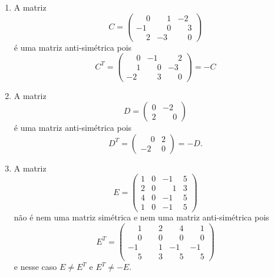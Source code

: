 \begin{exemplos}
\begin{enumerate}
        \item A matriz
            \[
                C = \begin{pmatrix}
                   \phantom{-} 0 & \phantom{-}1 & -2\\
                    -1 & \phantom{-}0 & \phantom{-}3\\
                    \phantom{-}2 & -3 & \phantom{-}0
                \end{pmatrix}
            \]
            é uma matriz anti-simétrica pois
             \[
                C^T = \begin{pmatrix}
                    \phantom{-}0 & -1 & \phantom{-}2\\
                    \phantom{-}1 & \phantom{-}0 & -3\\
                    -2 & \phantom{-}3 & \phantom{-}0
                \end{pmatrix} = -C
            \]

        \item A matriz
            \[
                D = \begin{pmatrix}
                    0 & -2\\
                    2 & \phantom{-}0
                \end{pmatrix}
            \]
            é uma matriz anti-simétrica pois
            \[
                D^T = \begin{pmatrix}
                    \phantom{-}0 & 2\\
                    -2 & 0
                \end{pmatrix} = -D.
            \]

        \item A matriz
            \[
                E = \begin{pmatrix}
                    1 & 0 & -1 & 5\\
                    2 & 0 & \phantom{-}1 & 3\\
                    4 & 0 & -1 & 5\\
                    1 & 0 & -1 & 5
                \end{pmatrix}
            \]
            não é nem uma matriz simétrica e nem uma matriz anti-simétrica pois
            \[
                E^T = \begin{pmatrix}
                    \phantom{-}1 & \phantom{-}2 & \phantom{-}4 & \phantom{-}1\\
                    \phantom{-}0 & \phantom{-}0 & \phantom{-}0 & \phantom{-}0\\
                    -1 & \phantom{-}1 & -1 & -1\\
                    \phantom{-}5 & \phantom{-}3 & \phantom{-}5 & \phantom{-}5
                \end{pmatrix}
            \]
            e nesse caso $E \ne E^T$ e $E^T  \ne -E$.
    \end{enumerate}
\end{exemplos}



